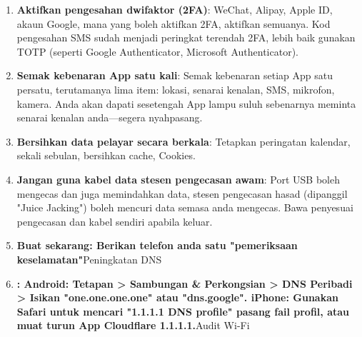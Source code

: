 \begin{enumerate}
  \item \textbf{Aktifkan pengesahan dwifaktor (2FA)}: WeChat, Alipay, Apple ID, akaun Google, mana yang boleh aktifkan 2FA, aktifkan semuanya. Kod pengesahan SMS sudah menjadi peringkat terendah 2FA, lebih baik gunakan TOTP (seperti Google Authenticator, Microsoft Authenticator).
  \item \textbf{Semak kebenaran App satu kali}: Semak kebenaran setiap App satu persatu, terutamanya lima item: lokasi, senarai kenalan, SMS, mikrofon, kamera. Anda akan dapati sesetengah App lampu suluh sebenarnya meminta senarai kenalan anda—segera nyahpasang.
  \item \textbf{Bersihkan data pelayar secara berkala}: Tetapkan peringatan kalendar, sekali sebulan, bersihkan cache, Cookies.
  \item \textbf{Jangan guna kabel data stesen pengecasan awam}: Port USB boleh mengecas dan juga memindahkan data, stesen pengecasan hasad (dipanggil "Juice Jacking") boleh mencuri data semasa anda mengecas. Bawa penyesuai pengecasan dan kabel sendiri apabila keluar.
  \item \textbf{Buat sekarang: Berikan telefon anda satu "pemeriksaan keselamatan"}Peningkatan DNS
  \item \textbf{: Android: Tetapan > Sambungan \& Perkongsian > DNS Peribadi > Isikan "one.one.one.one" atau "dns.google". iPhone: Gunakan Safari untuk mencari "1.1.1.1 DNS profile" pasang fail profil, atau muat turun App Cloudflare 1.1.1.1.}Audit Wi-Fi
\end{enumerate}

